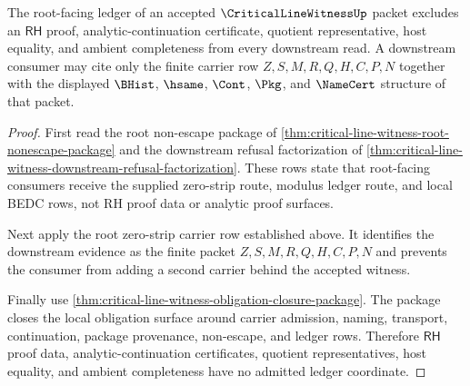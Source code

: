 \begin{theorem}
\label{thm:critical-line-witness-root-nonescape-ledger-row}
The root-facing ledger of an accepted $\CriticalLineWitnessUp$ packet excludes an $\mathsf{RH}$ proof, analytic-continuation certificate, quotient representative, host equality, and ambient completeness from every downstream read. A downstream consumer may cite only the finite carrier row $Z,S,M,R,Q,H,C,P,N$ together with the displayed $\BHist$, $\hsame$, $\Cont$, $\Pkg$, and $\NameCert$ structure of that packet.
\end{theorem}
\begin{proof}
First read the root non-escape package of \autoref{thm:critical-line-witness-root-nonescape-package} and the downstream refusal factorization of \autoref{thm:critical-line-witness-downstream-refusal-factorization}. These rows state that root-facing consumers receive the supplied zero-strip route, modulus ledger route, and local BEDC rows, not RH proof data or analytic proof surfaces.

Next apply the root zero-strip carrier row established above. It identifies the downstream evidence as the finite packet $Z,S,M,R,Q,H,C,P,N$ and prevents the consumer from adding a second carrier behind the accepted witness.

Finally use \autoref{thm:critical-line-witness-obligation-closure-package}. The package closes the local obligation surface around carrier admission, naming, transport, continuation, package provenance, non-escape, and ledger rows. Therefore $\mathsf{RH}$ proof data, analytic-continuation certificates, quotient representatives, host equality, and ambient completeness have no admitted ledger coordinate.
\end{proof}
